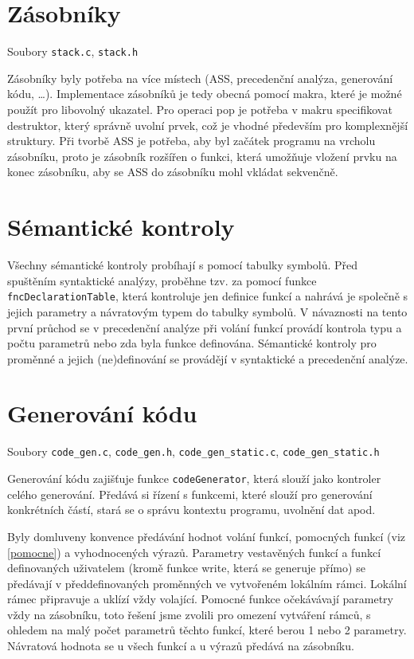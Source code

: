 \documentclass[a4paper, 12pt]{article}
\begin{document}
    \section{Zásobníky} \label{zasobniky}
    Soubory \texttt{stack.c}, \texttt{stack.h}

    Zásobníky byly potřeba na více místech (ASS, precedenční analýza, generování kódu, \ldots). Implementace zásobníků je tedy obecná pomocí makra, které je možné použít pro libovolný ukazatel. Pro operaci pop je potřeba v makru specifikovat destruktor, který správně uvolní prvek, což je vhodné především pro komplexnější struktury. Při tvorbě ASS je potřeba, aby byl začátek programu na vrcholu zásobníku, proto je zásobník rozšířen o funkci, která umožňuje vložení prvku na konec zásobníku, aby se ASS do zásobníku mohl vkládat sekvenčně.

    \section{Sémantické kontroly}
    Všechny sémantické kontroly probíhají s pomocí tabulky symbolů. Před spuštěním syntaktické analýzy, proběhne tzv.  za pomocí funkce \texttt{fncDeclarationTable}, která kontroluje jen definice funkcí a nahrává je společně s jejich parametry a návratovým typem do tabulky symbolů. V návaznosti na tento první průchod se v precedenční analýze při volání funkcí provádí kontrola typu a počtu parametrů nebo zda byla funkce definována. Sémantické kontroly pro proměnné a jejich (ne)definování se provádějí v syntaktické a precedenční analýze.

    \section{Generování kódu} \label{generovani}
    Soubory \texttt{code\_gen.c}, \texttt{code\_gen.h}, \texttt{code\_gen\_static.c}, \texttt{code\_gen\_static.h}

    Generování kódu zajišťuje funkce \texttt{codeGenerator}, která slouží jako kontroler celého generování. Předává si řízení s funkcemi, které slouží pro generování konkrétních částí, stará se o správu kontextu programu, uvolnění dat apod.

    Byly domluveny konvence předávání hodnot volání funkcí, pomocných funkcí (viz \ref{pomocne}) a vyhodnocených výrazů. Parametry vestavěných funkcí a funkcí definovaných uživatelem (kromě funkce write, která se generuje přímo) se předávají v předdefinovaných proměnných ve vytvořeném lokálním rámci. Lokální rámec připravuje a uklízí vždy volající. Pomocné funkce očekávávají parametry vždy na zásobníku, toto řešení jsme zvolili pro omezení vytváření rámců, s ohledem na malý počet parametrů těchto funkcí, které berou 1 nebo 2 parametry. Návratová hodnota se u všech funkcí a u výrazů předává na zásobníku.
\end{document}
